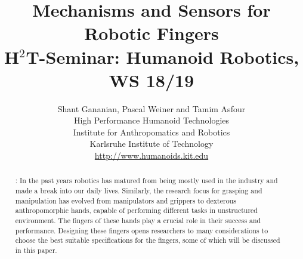 \documentclass[a4paper, 10pt, conference]{ieeeconf}      %
\title{\bf {\LARGE Mechanisms and Sensors for Robotic Fingers} \\
{\normalsize H$^2$T-Seminar: Humanoid Robotics, WS 18/19}}
\author{Shant Gananian, Pascal Weiner and Tamim Asfour \\ High Performance Humanoid Technologies \\ Institute for Anthropomatics and Robotics \\ Karlsruhe Institute of Technology \\
\url{http://www.humanoids.kit.edu}}
\begin{document}
\maketitle
\thispagestyle{plain}
\pagestyle{plain}
%
\begin{abstract}
: In the past years robotics has matured from being mostly used in the industry and made a break into our daily lives. Similarly, the research focus for grasping and manipulation has evolved from manipulators and grippers to dexterous anthropomorphic hands, capable of performing different tasks in unstructured environment.
The fingers of these hands play a crucial role in their success and performance. Designing these fingers opens researchers to many considerations to choose the best suitable specifications for the fingers, some of which will be discussed in this paper.
\end{abstract}

\end{document}
